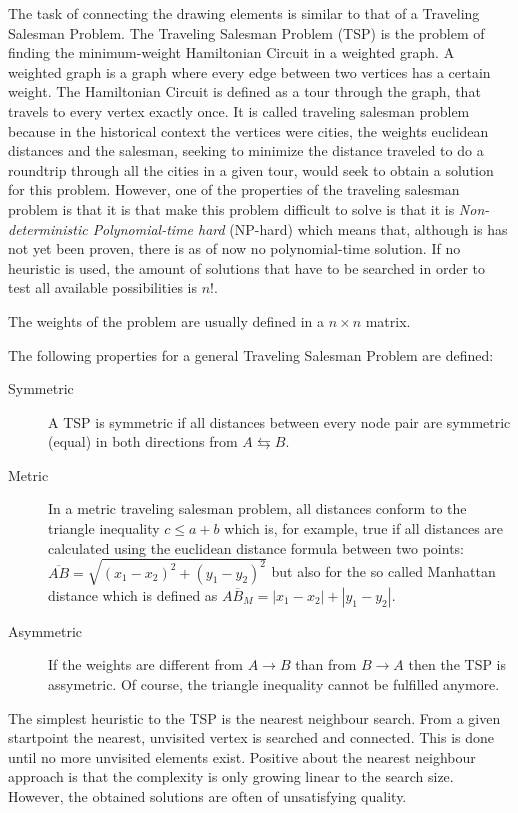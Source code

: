 The task of connecting the drawing elements is similar to that of a Traveling Salesman Problem.
The Traveling Salesman Problem (TSP) is the problem of finding the minimum-weight Hamiltonian Circuit in a weighted graph. A weighted graph is a graph where every edge between two vertices has a certain weight. The Hamiltonian Circuit is defined as a tour through the graph, that travels to every vertex exactly once. It is called traveling salesman problem because in the historical context the vertices were cities, the weights euclidean distances and the salesman, seeking to minimize the distance traveled to do a roundtrip through all the cities in a given tour, would seek to obtain a solution for this problem. However, one of the properties of the traveling salesman problem is that it is that make this problem difficult to solve is that it is \textit{Non-deterministic Polynomial-time hard} (NP-hard) which means that, although is has not yet been proven, there is as of now no polynomial-time solution. If no heuristic is used, the amount of solutions that have to be searched in order to test all available possibilities is $n!$.

The weights of the problem are usually defined in a  $n \times n$ matrix.

The following properties for a general Traveling Salesman Problem are defined:

\begin{description}
\item[Symmetric] A TSP is symmetric if all distances between every node pair are symmetric (equal) in both directions from $A \leftrightarrows B$.
\item[Metric] In a metric traveling salesman problem, all distances conform to the triangle inequality $c \leq a + b$ which is, for example, true if all distances are calculated using the euclidean distance formula between two points: $\overline{AB} = \sqrt{(x_1 -x_2)^2 + (y_1 - y_2)^2}$ but also for the so called Manhattan distance which is defined as $\overline{AB_M} = |x_1-x_2| + |y_1 - y_2|$.
\item[Asymmetric] If the weights are different from $A \rightarrow B$ than from $B \rightarrow A$ then the TSP is assymetric. Of course, the triangle inequality cannot be fulfilled anymore.
\end{description}

The simplest heuristic to the TSP is the nearest neighbour search. From a given startpoint the nearest, unvisited vertex is searched and connected. This is done until no more unvisited elements exist. Positive about the nearest neighbour approach is that the complexity is only growing linear to the search size. However, the obtained solutions are often of unsatisfying quality.

